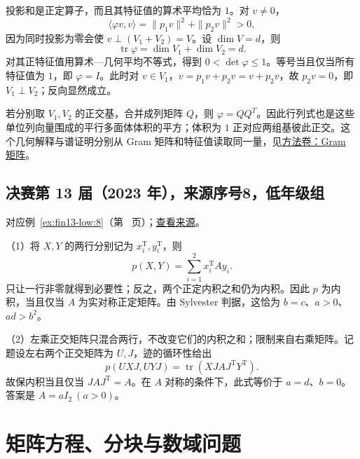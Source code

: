 \documentclass[12pt,fontset=fandol]{ctexart}
\begin{document}
\begin{solve}

投影和是正定算子，而且其特征值的算术平均恰为 $1$。对 $v\ne0$，
\[
\langle\varphi v,v\rangle=\|p_1v\|^2+\|p_2v\|^2>0,
\]
因为同时投影为零会使 $v\perp(V_1+V_2)=V$。设 $\dim V=d$，则
\[
\operatorname{tr}\varphi=\dim V_1+\dim V_2=d.
\]
对其正特征值用算术---几何平均不等式，得到 $0<\det\varphi\leq1$。等号当且仅当所有特征值为 $1$，即 $\varphi=I$。此时对 $v\in V_1$，$v=p_1v+p_2v=v+p_2v$，故 $p_2v=0$，即 $V_1\perp V_2$；反向显然成立。

\end{solve}

\begin{remark}[方法与条件]

若分别取 $V_1,V_2$ 的正交基，合并成列矩阵 $Q$，则 $\varphi=QQ^T$。因此行列式也是这些单位列向量围成的平行多面体体积的平方；体积为 $1$ 正对应两组基彼此正交。这个几何解释与谱证明分别从 Gram 矩阵和特征值读取同一量，见\hyperref[app:linear-gram]{方法卷：Gram 矩阵}。

\end{remark}

\subsection{决赛第 13 届（2023 年），来源序号8，低年级组}\label{ans:fin13-low:8}\label{pr:fin13-low:8}

对应例~\ref{ex:fin13-low:8}（第~\pageref{ex:fin13-low:8} 页）；\href{https://github.com/lzxcr/cmc-mathematics/blob/64916fa1fdbc3e444a652eca204d5669058ee321/src/problems/finals/13/08.md}{查看来源}。

\begin{solve}

（1）将 $X,Y$ 的两行分别记为 $x_i^{\mathrm T},y_i^{\mathrm T}$，则
\[
p(X,Y)=\sum_{i=1}^2x_i^{\mathrm T}Ay_i.
\]
只让一行非零就得到必要性；反之，两个正定内积之和仍为内积。因此 $p$ 为内积，当且仅当 $A$ 为实对称正定矩阵。由 Sylvester 判据，这恰为 $b=c$、$a>0$、$ad>b^2$。

（2）左乘正交矩阵只混合两行，不改变它们的内积之和；限制来自右乘矩阵。记题设左右两个正交矩阵为 $U,J$，迹的循环性给出
\[
p(UXJ,UYJ)=\operatorname{tr}(XJAJ^{\mathrm T}Y^{\mathrm T}).
\]
故保内积当且仅当 $JAJ^{\mathrm T}=A$。在 $A$ 对称的条件下，此式等价于 $a=d$、$b=0$。答案是 $\boxed{A=aI_2\ (a>0)}$。

\end{solve}

\section{矩阵方程、分块与数域问题}
\end{document}
